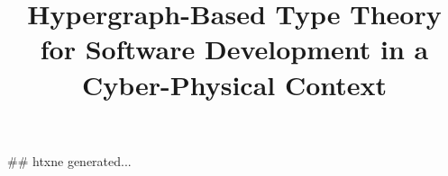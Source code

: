 ## htxne generated...
\title{Hypergraph-Based Type Theory 
for Software Development in a Cyber-Physical Context}